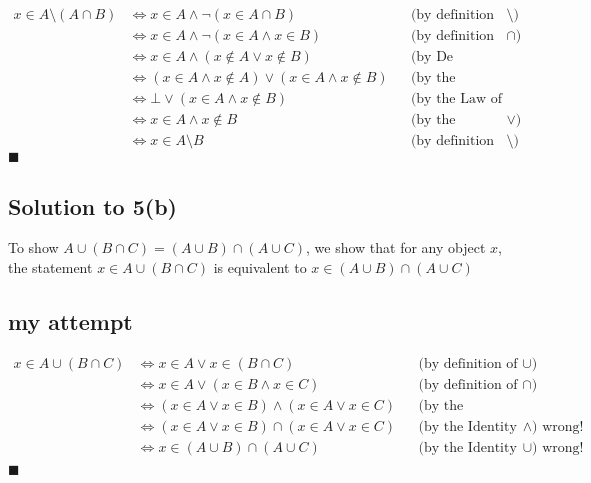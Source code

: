 \documentclass{scrartcl}
\begin{document}
    \begin{align*}
        x \in A \setminus (A \cap B) 
        &\Leftrightarrow x \in A \wedge \neg (x \in A \cap B) 
        && \text{(by definition of $\setminus$)} \\
        &\Leftrightarrow x \in A \wedge \neg (x \in A \wedge x \in B)
        && \text{(by definition of $\cap$)} \\
        &\Leftrightarrow x \in A \wedge (x \notin A \vee x \notin B)
        && \text{(by De Morgan's Law)} \\
        &\Leftrightarrow (x \in A \wedge x \notin A) \vee (x \in A \wedge x \notin B)
        && \text{(by the Distributive Law)} \\
        &\Leftrightarrow \bot \vee (x \in A \wedge x \notin B)
        && \text{(by the Law of Contradiction)} \\
        &\Leftrightarrow x \in A \wedge x \notin B
        && \text{(by the Identity Law for $\vee$)} \\
        &\Leftrightarrow x \in A \setminus B
        && \text{(by definition of $\setminus$)}
    \end{align*}
    \hfill $\blacksquare$


    \subsection*{Solution to 5(b)}
    To show $A \cup (B \cap C) = (A \cup B) \cap (A \cup C)$, we show that for any object $x$, the statement $x \in A \cup (B \cap C)$ is equivalent to $x \in (A \cup B) \cap (A \cup C)$

    \subsection*{my attempt}
    \begin{align*}
        x \in A \cup (B \cap C)
        &\Leftrightarrow x \in A \vee x \in (B \cap C)
        && \text{(by definition of $\cup$)} \\
        &\Leftrightarrow x \in A \vee (x \in B \wedge x \in C)
        && \text{(by definition of $\cap$)} \\
        &\Leftrightarrow (x \in A \vee x \in B) \wedge (x \in A \vee x \in C)
        && \text{(by the Distributive Law)} \\
        &\Leftrightarrow (x \in A \vee x \in B) \cap (x \in A \vee x \in C)
        && \text{(by the Identity Law for $\wedge$) wrong!} \\
        &\Leftrightarrow x \in (A \cup B) \cap (A \cup C)
        && \text{(by the Identity Law for $\cup$) wrong!} \\
    \end{align*}
    \hfill $\blacksquare$
\end{document}

